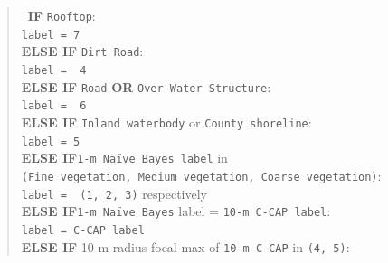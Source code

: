 \documentclass[
]{report}
\begin{document}
\begin{quote}
~\textbf{IF} \texttt{Rooftop}:\\
\hspace*{0.333em}\hspace*{0.333em}\hspace*{0.333em}\hspace*{0.333em}\texttt{label\ =\ 7}\\
\hspace*{0.333em}\textbf{ELSE IF} \texttt{Dirt\ Road}:\\
\hspace*{0.333em}\hspace*{0.333em}\hspace*{0.333em}\hspace*{0.333em}\texttt{label\ =\ \ 4}\\
\hspace*{0.333em}\textbf{ELSE IF} \texttt{Road} \textbf{OR} \texttt{Over-Water\ Structure}:\\
\hspace*{0.333em}\hspace*{0.333em}\hspace*{0.333em}\texttt{label\ =\ \ 6}\\
\hspace*{0.333em}\textbf{ELSE IF} \texttt{Inland\ waterbody} or \texttt{County\ shoreline}:\\
\hspace*{0.333em}\hspace*{0.333em}\hspace*{0.333em}\texttt{label\ =\ 5}\\
\hspace*{0.333em}\textbf{ELSE IF}\texttt{1-m\ Naïve\ Bayes\ label} in \texttt{(Fine\ vegetation,\ Medium\ vegetation,\ Coarse\ vegetation)}:\\
\hspace*{0.333em}\texttt{label\ =\ \ (1,\ 2,\ 3)} respectively\\
\hspace*{0.333em}\textbf{ELSE IF}\texttt{1-m\ Naïve\ Bayes} label = \texttt{10-m\ C-CAP\ label}:\\
\hspace*{0.333em}\hspace*{0.333em}\hspace*{0.333em}\texttt{label\ =\ C-CAP\ label}\\
\hspace*{0.333em}\textbf{ELSE IF} 10-m radius focal max of \texttt{10-m\ C-CAP} in \texttt{(4,\ 5)}:\\

\end{quote}
\end{document}
